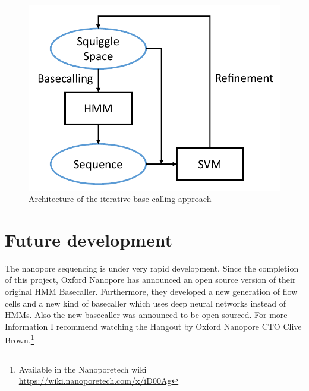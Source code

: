 \documentclass[]{scrartcl}
\begin{document}
\begin{figure}[htbp]
\centering
\includegraphics[width=.5\textwidth]{figures/iterative-basecalling.pdf}
\caption{Architecture of the iterative base-calling approach}
\label{fig:iterative}
\end{figure}

\section{Future development}
\label{sec:future}
The nanopore sequencing is under very rapid development. Since the completion of this project, Oxford Nanopore has announced an open source version of their original HMM Basecaller. Furthermore, they developed a new generation of flow cells and a new kind of basecaller which uses deep neural networks instead of HMMs. Also the new basecaller was announced to be open sourced. 
For more Information I recommend watching the Hangout by Oxford Nanopore CTO Clive Brown.\footnote{Available in the Nanoporetech wiki \url{https://wiki.nanoporetech.com/x/iD00Ag}}

\printbibliography
\end{document}
